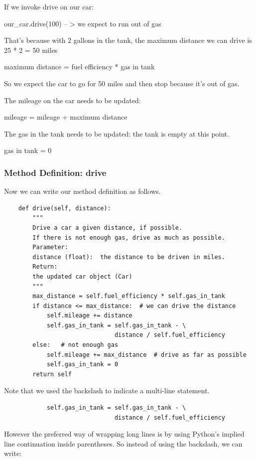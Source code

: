 \documentclass{article}
\begin{document}
If we invoke drive on our car:

our{\_}car.drive(100) – > we expect to run out of gas 

That’s because with 2 gallons in the tank, the maximum distance we can drive is 25 * 2 = 50 miles

maximum distance = fuel efficiency * gas in tank

So we expect the car to go for 50 miles and then stop because it’s out of gas.

The  mileage on the car needs to be updated:

mileage = mileage + maximum distance

The gas in the tank needs to be updated: the tank is empty at this point. 

gas in tank = 0

\subsubsection{Method Definition:  drive}

Now we can write our method definition as follows. 

\begin{lstlisting}
    def drive(self, distance):
        """
        Drive a car a given distance, if possible.
        If there is not enough gas, drive as much as possible.
        Parameter:
        distance (float):  the distance to be driven in miles.
        Return:
        the updated car object (Car)
        """
        max_distance = self.fuel_efficiency * self.gas_in_tank
        if distance <= max_distance:  # we can drive the distance
            self.mileage += distance
            self.gas_in_tank = self.gas_in_tank - \
                               distance / self.fuel_efficiency
        else:   # not enough gas
            self.mileage += max_distance  # drive as far as possible
            self.gas_in_tank = 0
        return self
\end{lstlisting} 

Note that we used the backslash  to indicate a multi-line statement.

\begin{lstlisting}
            self.gas_in_tank = self.gas_in_tank - \
                               distance / self.fuel_efficiency
\end{lstlisting} 

However the preferred way of wrapping long lines is by using Python's implied line continuation inside parentheses.  So instead of using the backslash, we can write: 
\end{document}
